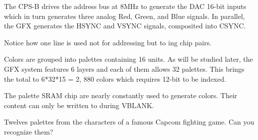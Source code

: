 



The CPS-B drives the address bus at 8MHz to generate the DAC 16-bit inputs which in turn generates three analog Red, Green, and Blue signals. In parallel, the GFX generates the HSYNC and VSYNC signals, composited into CSYNC.

Notice how one line is used not for addressing but to ing chip pairs. 








Colors are grouped into palettes containing 16 units. As will be studied later, the GFX system features 6 layers and each of them allows 32 palettes. This brings the total to 6*32*15 = 2, 880 colors which requires 12-bit to be indexed.


 The palette SRAM chip are nearly constantly used to generate colors. Their content can only be written to during VBLANK. 



 




\pagebreak




Twelves palettes from the characters of a famous Capcom fighting game. Can you recognize them?








